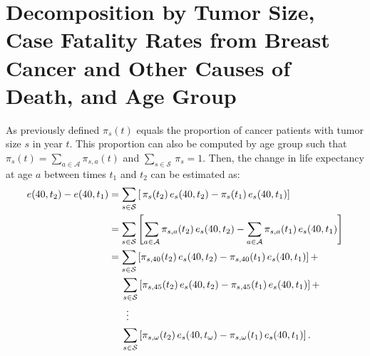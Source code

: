\documentclass[11pt,letterpaper]{article}
\theoremstyle{plain}
\theoremstyle{remark}
\numberwithin{equation}{section}
\begin{document}
\section{Decomposition by Tumor Size, Case Fatality Rates from
  Breast Cancer and Other Causes of Death, and Age Group}
\label{sec:age}
As previously defined $\pi_{s}(t)$ equals the proportion of cancer patients with tumor size
$s$ in year $t$. This proportion can also be computed by age group
such that $\pi_s(t)=\sum_{a\in\mathcal{A}}\pi_{s,a}(t)$ and
$\sum_{s\in\mathcal{S}}\,\pi_s=1$.  Then, the
change in life expectancy at age $a$ between times $t_1$ and $t_2$ can
be estimated as:
\begin{align*}
  e(40,t_2)-e(40,t_1)&=\sum_{s\in\mathcal{S}}\left[\,\pi_s(t_2)\,e_s(40,t_2)- \pi_s(t_1)\,e_s(40,t_1)\right] \\
                     &=\sum_{s\in\mathcal{S}} \left[\sum_{a\in\mathcal{A}}\pi_{s,a}(t_2)\,e_s(40,t_2)- \sum_{a\in\mathcal{A}}\pi_{s,a}(t_1)\,e_s(40,t_1) \right]\\
                     &=\sum_{s\in\mathcal{S}}\left[\pi_{s,40}(t_2)\,e_s(40,t_2)-
                       \pi_{s,40}(t_1)\,e_s(40,t_1)\right] +\\
                     &\hspace{0.18in}\sum_{s\in\mathcal{S}}\left[\pi_{s,45}(t_2)\,e_s(40,t_2)- \pi_{s,45}(t_1)\,e_s(40,t_1)\right] + \\
  &\phantom{=\Sigma}\vdots \\
                     &\hspace{0.18in}\sum_{s\in\mathcal{S}}\left[\pi_{s,\omega}(t_2)\,e_s(40,t_{\omega})- \pi_{s,\omega}(t_1)\,e_s(40,t_1)\right]. \notag 
 \end{align*}
\end{document}

